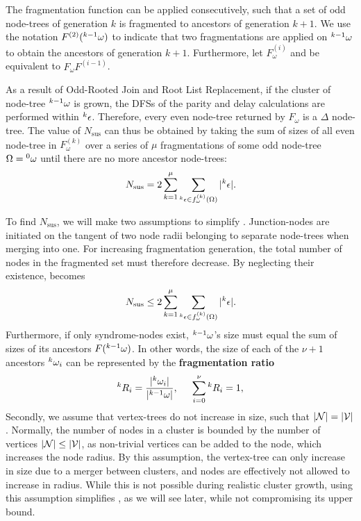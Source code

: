 The fragmentation function can be applied consecutively, such that a set of odd node-trees of generation $k$ is fragmented to ancestors of generation $k+1$. We use the notation $F^{(2)}({}^{k-1}\omega)$ to indicate that two fragmentations are applied on ${}^{k-1}\omega$ to obtain the ancestors of generation $k+1$. Furthermore, let $F_\omega^{(i)}$ and be equivalent to $F_\omega F^{(i-1)}$. 

As a result of Odd-Rooted Join and Root List Replacement, if the cluster of node-tree ${}^{k-1}\omega$ is grown, the DFSs of the parity and delay calculations are performed within ${}^{k}\epsilon$. Therefore, every even node-tree returned by $F_\omega$ is a $\Delta$ node-tree. The value of $N_{\text{sus}}$ can thus be obtained by taking the sum of sizes of all even node-tree in $F_\omega^{(k)}$ over a series of $\mu$ fragmentations of some odd node-tree $\Omega = {}^{0}\omega$ until there are no more ancestor node-trees:
\begin{equation}\label{eq:npdc}
  N_{\text{sus}} = 2\sum_{k=1}^\mu{ \sum_{ \pre{k}\epsilon \in f_\omega^{(k)}(\Omega) }{ \abs{\pre{k}\epsilon}} }.
\end{equation}

To find $N_{\text{sus}}$, we will make two assumptions to simplify . Junction-nodes are initiated on the tangent of two node radii belonging to separate node-trees when merging into one. For increasing fragmentation generation, the total number of nodes in the fragmented set must therefore decrease. By neglecting their existence,  becomes
\begin{equation}\label{eq:npdc2}
  N_{\text{sus}} \leq 2\sum_{k=1}^\mu{ \sum_{ \pre{k}\epsilon \in f_\omega^{(k)}(\Omega) }{ \abs{\pre{k}\epsilon}} }.
\end{equation}
Furthermore, if only syndrome-nodes exist, ${}^{k-1}\omega$'s size must equal the sum of sizes of its ancestors $F({}^{k-1}\omega)$. In other words, the size of each of the $\nu+1$ ancestors ${}^{k}\omega_i$ can be represented by the \textbf{fragmentation ratio}
\begin{equation}\label{eq:ratio}
  \pre{k}R_i = \frac{\abs{\pre{k}\omega_i}}{\abs{\pre{k-1}\omega}}, \hspace{0.5cm} \sum_{i=0}^{\nu}{\pre{k}R_i} = 1,
\end{equation}
Secondly, we assume that vertex-trees do not increase in size, such that $\lvert\mathcal{N}\rvert=\lvert\mathcal{V}\rvert$. Normally, the number of nodes in a cluster is bounded by the number of vertices $\lvert\mathcal{N}\rvert\leq \lvert\mathcal{V}\rvert$, as non-trivial vertices can be added to the node, which increases the node radius. By this assumption, the vertex-tree can only increase in size due to a merger between clusters, and nodes are effectively not allowed to increase in radius. While this is not possible during realistic cluster growth, using this assumption simplifies , as we will see later, while not compromising its upper bound. 

